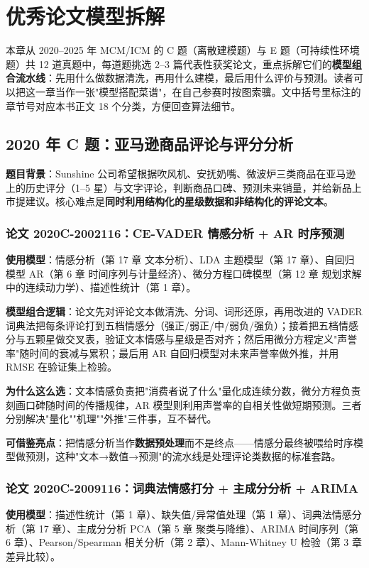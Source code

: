 \chapter{优秀论文模型拆解}

本章从 2020--2025 年 MCM/ICM 的 C 题（离散建模题）与 E 题（可持续性环境题）共 12 道真题中，每道题挑选 2--3 篇代表性获奖论文，重点拆解它们的\textbf{模型组合流水线}：先用什么做数据清洗，再用什么建模，最后用什么评价与预测。读者可以把这一章当作一张"模型搭配菜谱"，在自己参赛时按图索骥。文中括号里标注的章节号对应本书正文 18 个分类，方便回查算法细节。

\section{2020 年 C 题：亚马逊商品评论与评分分析}

\textbf{题目背景}：Sunshine 公司希望根据吹风机、安抚奶嘴、微波炉三类商品在亚马逊上的历史评分（1--5 星）与文字评论，判断商品口碑、预测未来销量，并给新品上市提建议。核心难点是\textbf{同时利用结构化的星级数据和非结构化的评论文本}。

\subsection{论文 2020C-2002116：CE-VADER 情感分析 + AR 时序预测}
\textbf{使用模型}：情感分析（第 17 章 文本分析）、LDA 主题模型（第 17 章）、自回归模型 AR（第 6 章 时间序列与计量经济）、微分方程口碑模型（第 12 章 规划求解中的连续动力学）、描述性统计（第 1 章）。

\textbf{模型组合逻辑}：论文先对评论文本做清洗、分词、词形还原，再用改进的 VADER 词典法把每条评论打到五档情感分（强正/弱正/中/弱负/强负）；接着把五档情感分与五颗星做交叉表，验证文本情感与星级是否对齐；然后用微分方程定义"声誉率"随时间的衰减与累积；最后用 AR 自回归模型对未来声誉率做外推，并用 RMSE 在验证集上检验。

\textbf{为什么这么选}：文本情感负责把"消费者说了什么"量化成连续分数，微分方程负责刻画口碑随时间的传播规律，AR 模型则利用声誉率的自相关性做短期预测。三者分别解决"量化""机理""外推"三件事，互不替代。

\textbf{可借鉴亮点}：把情感分析当作\textbf{数据预处理}而不是终点——情感分最终被喂给时序模型做预测，这种"文本→数值→预测"的流水线是处理评论类数据的标准套路。

\subsection{论文 2020C-2009116：词典法情感打分 + 主成分分析 + ARIMA}
\textbf{使用模型}：描述性统计（第 1 章）、缺失值/异常值处理（第 1 章）、词典法情感分析（第 17 章）、主成分分析 PCA（第 5 章 聚类与降维）、ARIMA 时间序列（第 6 章）、Pearson/Spearman 相关分析（第 2 章）、Mann-Whitney U 检验（第 3 章 差异比较）。

